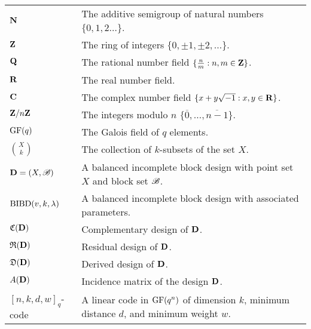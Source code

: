 \documentclass[../../main]{subfiles}
\begin{document}
 
 \begin{longtabu} to \textwidth{X[1,l] X[2,l]} %
 $\mathbf{N}$ & The additive semigroup of natural numbers $\{0,1,2\dots$\}. \\
 $\mathbf{Z}$ & The ring of integers $\{0, \pm1, \pm2, \dots$\}. \\
 $\mathbf{Q}$ & The rational number field $\{\frac{n}{m} : n,m \in \mathbf{Z}\}$. \\
 $\mathbf{R}$ & The real number field. \\
 $\mathbf{C}$ & The complex number field $\{x+y\sqrt{-1} : x,y \in \mathbf{R}\}$. \\
 $\mathbf{Z}/n\mathbf{Z}$ & The integers modulo $n$ $\{\overline{0}, \dots, \overline{n-1}\}$. \\
 $\text{GF}(q)$ & The Galois field of $q$ elements. \\
 $\binom{X}{k}$ & The collection of $k$-subsets of the set $X$. \\
 $\mathbf{D}=(X,\mathscr{B})$ & A balanced incomplete block design with point set $X$ and block set $\mathscr{B}$. \\
 $\text{BIBD}(v,k,\lambda)$ & A balanced incomplete block design with associated parameters. \\
 $\mathfrak{C}(\mathbf{D})$ & Complementary design of $\mathbf{D}$. \\
 $\mathfrak{R}(\mathbf{D})$ & Residual design of $\mathbf{D}$. \\
 $\mathfrak{D}(\mathbf{D})$ & Derived design of $\mathbf{D}$. \\
 $A(\mathbf{D})$ & Incidence matrix of the design $\mathbf{D}$. \\
 $[n,k,d,w]_q$-code & A linear code in $\text{GF}(q^n)$ of dimension $k$, minimum distance $d$, and minimum weight $w$. \\

\end{longtabu}
\end{document}
